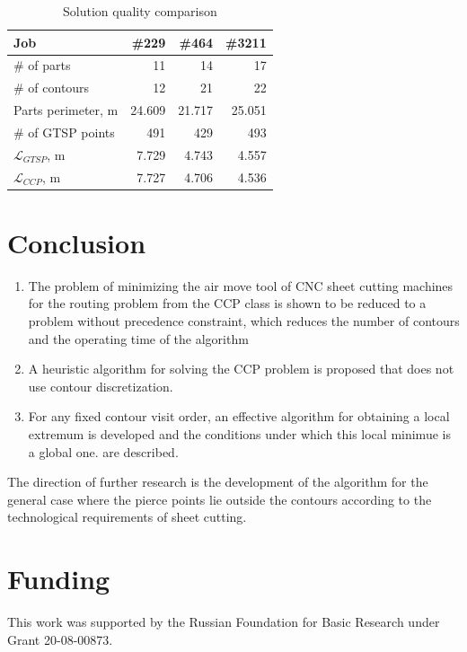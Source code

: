 \documentclass[]{interact}
\theoremstyle{plain}%
\theoremstyle{definition}
\theoremstyle{remark}
\begin{document}
\begin{table}[h]
  \begin{center}
  \begin{tabular}{l|*{3}{r}}
      Job & \#229 & \#464 & \#3211 \\
      \hline
      \# of parts & 11 & 14 & 17\\
      \# of contours & 12 & 21 & 22 \\
      Parts perimeter, m & 24.609 & 21.717 & 25.051 \\
      \# of GTSP points & 491 & 429 & 493 \\
      $\mathcal L_{GTSP}$, m & 7.729 & 4.743 & 4.557 \\
      $\mathcal L_{CCP}$, m & 7.727 & 4.706 & 4.536 \\
  \end{tabular}
  \caption{Solution quality comparison}
  \label{ccp-vs-gtsp}
  \end{center}
\end{table}

\section{Conclusion}

\begin{enumerate}
  \item
  The problem of minimizing the air move tool of CNC sheet cutting machines
  for the routing problem from the CCP class
  is shown to be reduced
  to a problem without precedence constraint,
  which reduces the number of contours and the operating time of the algorithm
  \item
  A heuristic algorithm for solving the CCP problem is proposed that does not use contour discretization.
  \item
  For any fixed contour visit order,
  an effective algorithm for obtaining a local extremum is developed
  and the conditions under which
  this local minimue is a global one.
  are described.
\end{enumerate}

The direction of further research is the development of the algorithm
for the general case where the pierce points lie
outside the contours
according to the technological requirements of sheet cutting.

\section*{Funding}

This work was supported by the
Russian Foundation for Basic Research
under Grant
20-08-00873.



\nocite{*}
\end{document}
